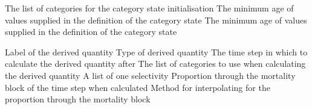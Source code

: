  {The list of categories for the category state initialisation}
 {The minimum age of values supplied in the definition of the category state}
 {The minimum age of values supplied in the definition of the category state}
\par\par
\par\textbf{}\par
\par\textbf{}\par
\par\textbf{}\par
\par\textbf{}\par
\par\textbf{}\par
\par\textbf{}\par
\par\textbf{}\par
\par\textbf{}\par
{}\par\par
{} {Label of the derived quantity}
 {Type of derived quantity}
 {The time step in which to calculate the derived quantity after}
 {The list of categories to use when calculating the derived quantity}
 {A list of one selectivity}
 {Proportion through the mortality block of the time step when calculated}
 {Method for interpolating for the proportion through the mortality block}
\par\textbf{}\par
\par\textbf{}\par
